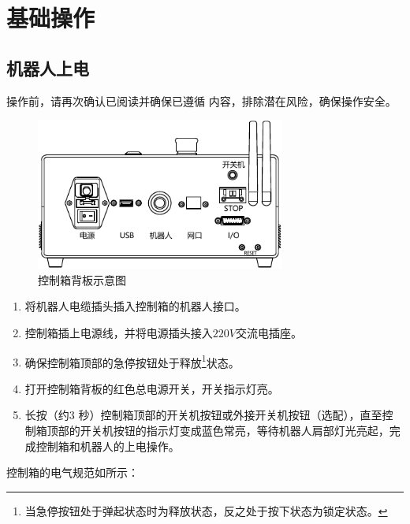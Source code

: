 \chapter{基础操作}
\label{cha:基础操作}

\section{机器人上电}

操作前，请再次确认已阅读并确保已遵循 内容，排除潜在风险，确保操作安全。

\begin{figure}[hb]
    \centering
    \includegraphics[height=5cm]{line_graphs/robot_control_box_back.pdf}
    \caption{控制箱背板示意图}
    \label{fig:控制箱背板示意图}
\end{figure}

\begin{enumerate}
\item 将机器人电缆插头插入控制箱的机器人接口。
\item 控制箱插上电源线，并将电源插头接入$\!220 \unit{V}\!$交流电插座。
\item 确保控制箱顶部的急停按钮处于释放\footnote{当急停按钮处于弹起状态时为释放状态，反之处于按下状态为锁定状态。}状态。
\item 打开控制箱背板的红色总电源开关，开关指示灯亮。
\item 长按（约3 秒）控制箱顶部的开关机按钮或外接开关机按钮（选配），直至控制箱顶部的开关机按钮的指示灯变成蓝色常亮，等待机器人肩部灯光亮起，完成控制箱和机器人的上电操作。
\end{enumerate}

控制箱的电气规范如所示：

